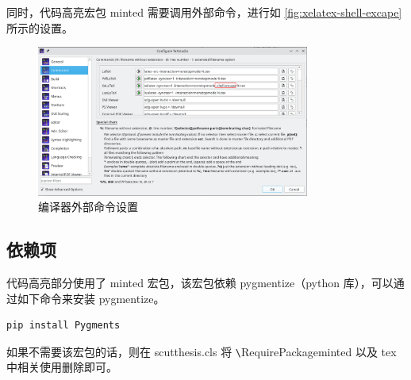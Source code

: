 同时，代码高亮宏包 minted 需要调用外部命令，进行如 \autoref{fig:xelatex-shell-excape} 所示的设置。

\begin{figure}[htbp]
    \centering
    \includegraphics[width=0.8\textwidth]{img/xelatex-shell-escape.png}
    \caption{编译器外部命令设置}
    \label{fig:xelatex-shell-excape}
\end{figure}

\subsection{依赖项}

代码高亮部分使用了 minted 宏包，该宏包依赖 pygmentize（python 库），可以通过如下命令来安装 pygmentize。

\begin{verbatim}
pip install Pygments
\end{verbatim}

如果不需要该宏包的话，则在 scutthesis.cls 将 \verb|\|RequirePackage{minted} 以及 tex 中相关使用删除即可。